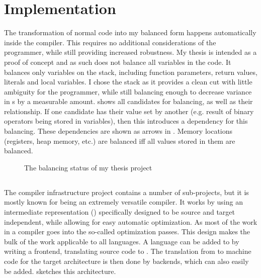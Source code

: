 \chapter{Implementation}
\label{pass}
The transformation of normal code into my balanced form happens automatically inside the compiler.
This requires no additional considerations of the programmer, while still providing increased robustness.
My thesis is intended as a proof of concept and as such does not balance all variables in the code.
It balances only variables on the stack, including function parameters, return values, literals and local variables.
I chose the stack as it provides a clean cut with little ambiguity for the programmer, while still balancing enough to decrease variance in \hammingw{}s by a measurable amount.
 shows all candidates for balancing, as well as their relationship.
If one candidate has their value set by another (e.g. result of binary operators being stored in variables), then this introduces a dependency for this balancing.
These dependencies are shown as arrows in .
Memory locations (registers, heap memory, etc.) are balanced iff all values stored in them are balanced.

\begin{figure}[h]
  \centering
  \caption{The balancing status of my thesis project}
  \label{fig:implementation}
\end{figure}

\section{\llvm{}}
\label{llvm}
The \llvm{} compiler infrastructure project\cite{lattner2010llvm} contains a number of sub-projects, but it is mostly known for being an extremely versatile compiler.
It works by using an intermediate representation (\ir{}) specifically designed to be source and target independent, while allowing for easy automatic optimization.
As most of the work in a compiler goes into the so-called optimization passes.
This design makes the bulk of the work applicable to all languages.
A language can be added to \llvm{} by writing a frontend, translating source code to \ir{}.
The translation from \ir{} to machine code for the target architecture is then done by backends, which can also easily be added.
 sketches this architecture.

